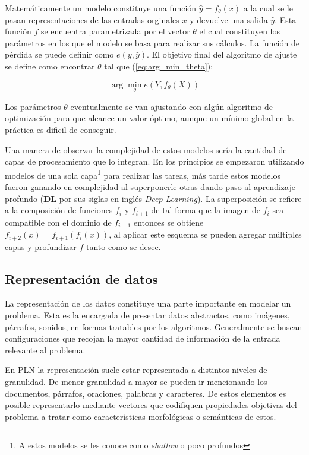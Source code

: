 Matemáticamente un modelo constituye una función $\hat{y} = f_{\theta}(x)$ a la cual se 
le pasan representaciones de las entradas orginales $x$ y devuelve una salida $\hat{y}$. Esta función $f$ se encuentra
parametrizada por el vector $\theta$ el cual constituyen los parámetros en los que el modelo se basa para realizar sus
cálculos. La función de pérdida se puede definir como $e(y, \hat{y})$. El objetivo final del algoritmo de ajuste 
se define como encontrar $\theta$ tal que (\ref{eq:arg_min_theta}):

\begin{equation}
	\arg \min_{\theta} e(Y, f_{\theta}(X))
\end{equation}\label{eq:arg_min_theta}

Los parámetros $\theta$ eventualmente se van ajustando con algún algoritmo de optimización para que alcance 
un valor óptimo, aunque un mínimo global en la práctica es dificil de conseguir.

Una manera de observar la complejidad de estos modelos sería la cantidad de capas de procesamiento que lo integran.
En los principios se empezaron utilizando modelos de una sola capa\footnote{A estos modelos se les conoce 
como \emph{shallow} o poco profundos} para realizar 
las tareas, más tarde estos modelos fueron ganando en complejidad al superponerle otras dando paso al 
aprendizaje profundo (\textbf{DL} por sus siglas en inglés \emph{Deep Learning}). La superposición se refiere
a la composición de funciones $f_i$ y $f_{i+1}$ de tal forma que la imagen de $f_i$ sea compatible con el dominio de 
$f_{i+1}$ entonces se obtiene $f_{i+2}(x) = f_{i+1}(f_i(x))$, al aplicar este esquema se pueden agregar múltiples
capas y profundizar $f$ tanto como se desee.


\subsection{Representación de datos}

La representación de los datos constituye una parte importante en modelar un problema. Esta 
es la encargada de presentar datos abstractos, como imágenes, párrafos, sonidos, en formas tratables
por los algoritmos. Generalmente se buscan configuraciones que recojan la mayor cantidad de información 
de la entrada relevante al problema.

En PLN la representación suele estar representada a distintos niveles de granulidad.
De menor granulidad a mayor se pueden ir mencionando los documentos, párrafos, oraciones, palabras y
caracteres. De estos elementos es posible representarlo mediante vectores que codifiquen propiedades
objetivas del problema a tratar como características morfológicas o semánticas de estos.

